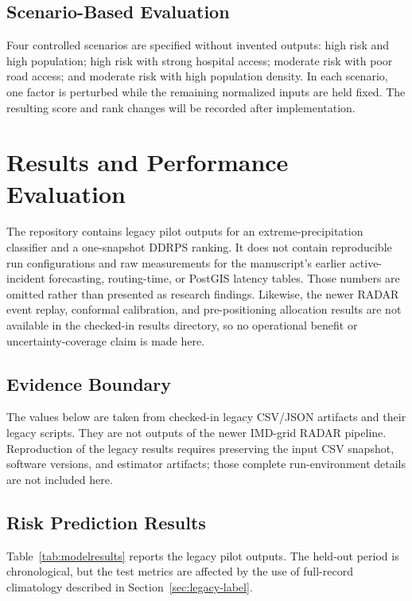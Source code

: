 \documentclass[conference]{IEEEtran}
\begin{document}
\subsection{Scenario-Based Evaluation}
Four controlled scenarios are specified without invented outputs: high risk and
high population; high risk with strong hospital access; moderate risk with poor
road access; and moderate risk with high population density. In each scenario,
one factor is perturbed while the remaining normalized inputs are held fixed.
The resulting score and rank changes will be recorded after implementation.

\section{Results and Performance Evaluation}
\label{sec:results}

The repository contains legacy pilot outputs for an extreme-precipitation
classifier and a one-snapshot DDRPS ranking. It does not contain reproducible
run configurations and raw measurements for the manuscript's earlier
active-incident forecasting, routing-time, or PostGIS latency tables. Those
numbers are omitted rather than presented as research findings. Likewise, the
newer RADAR event replay, conformal calibration, and pre-positioning allocation
results are not available in the checked-in results directory, so no operational
benefit or uncertainty-coverage claim is made here.

\subsection{Evidence Boundary}
The values below are taken from checked-in legacy CSV/JSON artifacts and their
legacy scripts. They are not outputs of the newer IMD-grid RADAR pipeline.
Reproduction of the legacy results requires preserving the input CSV snapshot,
software versions, and estimator artifacts; those complete run-environment
details are not included here.

\subsection{Risk Prediction Results}
Table~\ref{tab:modelresults} reports the legacy pilot outputs. The held-out
period is chronological, but the test metrics are affected by the use of
full-record climatology described in Section~\ref{sec:legacy-label}.
\end{document}
